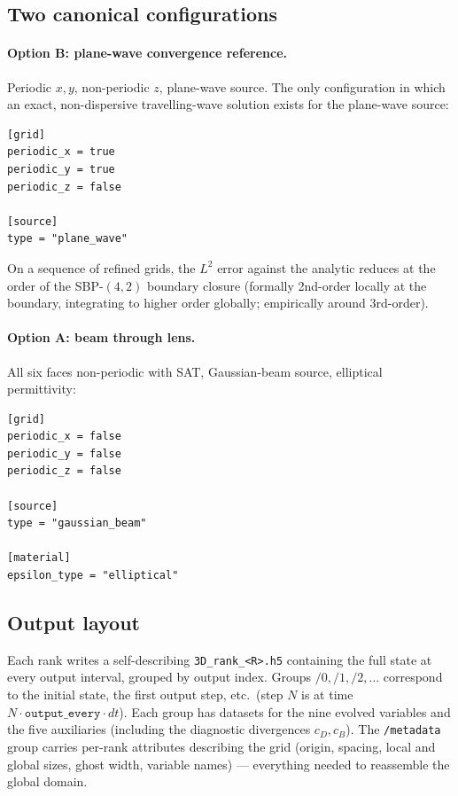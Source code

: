 \documentclass[11pt]{article}
\begin{document}
\subsection{Two canonical configurations}

\paragraph{Option B: plane-wave convergence reference.}
Periodic $x, y$, non-periodic $z$, plane-wave source.  The only
configuration in which an exact, non-dispersive travelling-wave
solution exists for the plane-wave source:
\begin{lstlisting}[style=shell]
[grid]
periodic_x = true
periodic_y = true
periodic_z = false

[source]
type = "plane_wave"
\end{lstlisting}
On a sequence of refined grids, the $L^2$ error against the
analytic reduces at the order of the SBP-$(4,2)$ boundary closure
(formally 2nd-order locally at the boundary, integrating to
higher order globally; empirically around 3rd-order).

\paragraph{Option A: beam through lens.}
All six faces non-periodic with SAT, Gaussian-beam source,
elliptical permittivity:
\begin{lstlisting}[style=shell]
[grid]
periodic_x = false
periodic_y = false
periodic_z = false

[source]
type = "gaussian_beam"

[material]
epsilon_type = "elliptical"
\end{lstlisting}

\subsection{Output layout}

Each rank writes a self-describing \texttt{3D\_rank\_<R>.h5}
containing the full state at every output interval, grouped by
output index.  Groups $/0, /1, /2, \ldots$ correspond to the
initial state, the first output step, etc.\ (step $N$ is at time
$N \cdot \mathtt{output\_every}\cdot dt$).  Each group has
datasets for the nine evolved variables and the five auxiliaries
(including the diagnostic divergences $c_D, c_B$).  The
\texttt{/metadata} group carries per-rank attributes describing
the grid (origin, spacing, local and global sizes, ghost width,
variable names) --- everything needed to reassemble the global
domain.
\end{document}
